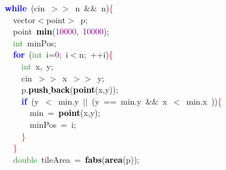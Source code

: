 \documentclass[10pt,a4paper,twoside]{article}
\begin{document}
{{{{{{{{{{\mbox{}\ \ \textbf{\textcolor{Blue}{while}}\ \textcolor{BrickRed}{(}cin\ \textcolor{BrickRed}{$>>$}\ n\ \textcolor{BrickRed}{\&\&}\ n\textcolor{BrickRed}{)}\textcolor{Red}{\{} \\
\mbox{}\ \ \ \ vector\textcolor{BrickRed}{$<$}point\textcolor{BrickRed}{$>$}\ p\textcolor{BrickRed}{;} \\
\mbox{}\ \ \ \ point\ \textbf{\textcolor{Black}{min}}\textcolor{BrickRed}{(}\textcolor{Purple}{10000}\textcolor{BrickRed}{,}\ \textcolor{Purple}{10000}\textcolor{BrickRed}{);} \\
\mbox{}\ \ \ \ \textcolor{ForestGreen}{int}\ minPos\textcolor{BrickRed}{;} \\
\mbox{}\ \ \ \ \textbf{\textcolor{Blue}{for}}\ \textcolor{BrickRed}{(}\textcolor{ForestGreen}{int}\ i\textcolor{BrickRed}{=}\textcolor{Purple}{0}\textcolor{BrickRed}{;}\ i\textcolor{BrickRed}{$<$}n\textcolor{BrickRed}{;}\ \textcolor{BrickRed}{++}i\textcolor{BrickRed}{)}\textcolor{Red}{\{} \\
\mbox{}\ \ \ \ \ \ \textcolor{ForestGreen}{int}\ x\textcolor{BrickRed}{,}\ y\textcolor{BrickRed}{;} \\
\mbox{}\ \ \ \ \ \ cin\ \textcolor{BrickRed}{$>>$}\ x\ \textcolor{BrickRed}{$>>$}\ y\textcolor{BrickRed}{;} \\
\mbox{}\ \ \ \ \ \ p\textcolor{BrickRed}{.}\textbf{\textcolor{Black}{push$\_$back}}\textcolor{BrickRed}{(}\textbf{\textcolor{Black}{point}}\textcolor{BrickRed}{(}x\textcolor{BrickRed}{,}y\textcolor{BrickRed}{));}\ \ \ \ \ \  \\
\mbox{}\ \ \ \ \ \ \textbf{\textcolor{Blue}{if}}\ \textcolor{BrickRed}{(}y\ \textcolor{BrickRed}{$<$}\ min\textcolor{BrickRed}{.}y\ \textcolor{BrickRed}{$||$}\ \textcolor{BrickRed}{(}y\ \textcolor{BrickRed}{==}\ min\textcolor{BrickRed}{.}y\ \textcolor{BrickRed}{\&\&}\ x\ \textcolor{BrickRed}{$<$}\ min\textcolor{BrickRed}{.}x\ \textcolor{BrickRed}{))}\textcolor{Red}{\{} \\
\mbox{}\ \ \ \ \ \ \ \ min\ \textcolor{BrickRed}{=}\ \textbf{\textcolor{Black}{point}}\textcolor{BrickRed}{(}x\textcolor{BrickRed}{,}y\textcolor{BrickRed}{);} \\
\mbox{}\ \ \ \ \ \ \ \ minPos\ \textcolor{BrickRed}{=}\ i\textcolor{BrickRed}{;} \\
\mbox{}\ \ \ \ \ \ \textcolor{Red}{\}} \\
\mbox{}\ \ \ \ \textcolor{Red}{\}} \\
\mbox{}\ \ \ \ \textcolor{ForestGreen}{double}\ tileArea\ \textcolor{BrickRed}{=}\ \textbf{\textcolor{Black}{fabs}}\textcolor{BrickRed}{(}\textbf{\textcolor{Black}{area}}\textcolor{BrickRed}{(}p\textcolor{BrickRed}{));} \\
}}}}}}}}}}
\end{document}
